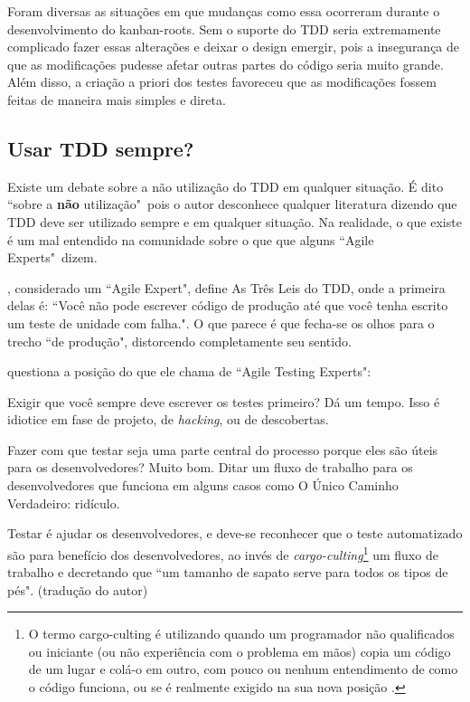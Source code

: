 Foram diversas as situações em que mudanças como essa ocorreram durante o desenvolvimento do kanban-roots. Sem o suporte do TDD seria extremamente complicado fazer essas alterações e deixar o design emergir, pois a insegurança de que as modificações pudesse afetar outras partes do código seria muito grande. Além disso, a criação a priori dos testes favoreceu que as modificações fossem feitas de maneira mais simples e direta.

\subsection{Usar TDD sempre?} %
\label{sec:usar_tdd_sempre}

Existe um debate sobre a não utilização do TDD em qualquer situação. É dito ``sobre a \textbf{não} utilização"\ pois o autor desconhece qualquer literatura dizendo que TDD deve ser utilizado sempre e em qualquer situação. Na realidade, o que existe é um mal entendido na comunidade sobre o que que alguns ``Agile Experts"\ dizem.

, considerado um ``Agile Expert", define As Três Leis do TDD, onde a primeira delas é: ``Você não pode escrever código de produção até que você tenha escrito um teste de unidade com falha.". O que parece é que fecha-se os olhos para o trecho ``de produção", distorcendo completamente seu sentido.

 questiona a posição do que ele chama de ``Agile Testing Experts":

\begin{citacao}
Exigir que você sempre deve escrever os testes primeiro? Dá um tempo. Isso é idiotice em fase de projeto, de \textit{hacking}, ou de descobertas.

Fazer com que testar seja uma parte central do processo porque eles são úteis para os desenvolvedores? Muito bom. Ditar um fluxo de trabalho para os desenvolvedores que funciona em alguns casos como O Único Caminho Verdadeiro: ridículo.

Testar é ajudar os desenvolvedores, e deve-se reconhecer que o teste automatizado são para benefício dos desenvolvedores, ao invés de \textit{cargo-culting}\footnote{O termo cargo-culting é utilizando quando um programador não qualificados ou iniciante (ou não experiência com o problema em mãos) copia um código de um lugar e colá-o em outro, com pouco ou nenhum entendimento de como o código funciona, ou se é realmente exigido na sua nova posição \cite{CargoCulting}.} um fluxo de trabalho e decretando que ``um tamanho de sapato serve para todos os tipos de pés". (tradução do autor)
\end{citacao}

